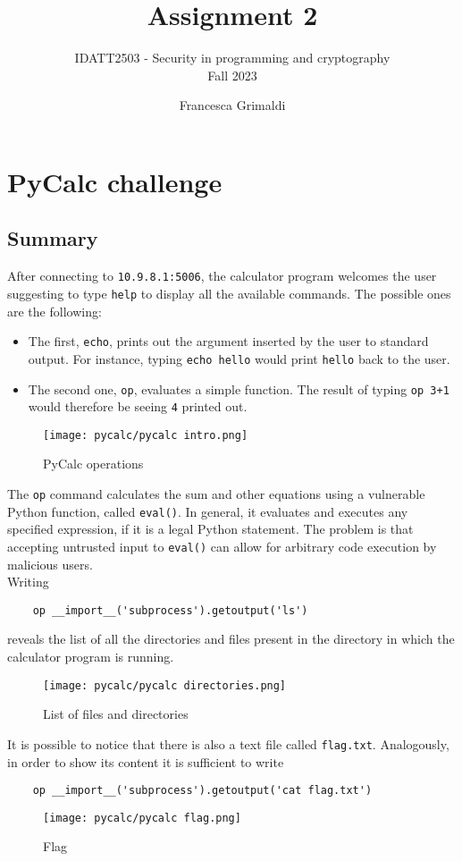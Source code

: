 \documentclass{article}
\title{%
    \huge Assignment 2
    }
\subtitle{%
    IDATT2503 - Security in programming and cryptography\\
    Fall 2023
    }
\author{%
  Francesca Grimaldi
}
\date{}
\begin{document}
\maketitle




\section{PyCalc challenge}

\subsection{Summary}
After connecting to \texttt{10.9.8.1:5006}, the calculator program welcomes the user suggesting to type \texttt{help} to display all the available commands. The possible ones are the following:
\begin{itemize}
    \item{The first, \texttt{echo}, prints out the argument inserted by the user to standard output. For instance, typing \texttt{echo hello} would print \texttt{hello} back to the user.}
    \item{The second one, \texttt{op}, evaluates a simple function. The result of typing \texttt{op 3+1} would therefore be seeing \texttt{4} printed out.}
\end{itemize}
\begin{figure}[H]
    \centering
    \texttt{[image: pycalc/pycalc intro.png]}
    \caption{PyCalc operations}
    \label{fig:PyCalc intro}
\end{figure}
The \texttt{op} command calculates the sum and other equations using a vulnerable Python function, called \texttt{eval()}. In general, it evaluates and executes any specified expression, if it is a legal Python statement. The problem is that accepting untrusted input to \texttt{eval()} can allow for arbitrary code execution by malicious users.\\
Writing
\begin{verbatim}
    op __import__('subprocess').getoutput('ls')
\end{verbatim}
reveals the list of all the directories and files present in the directory in which the calculator program is running.
\begin{figure}[H]
    \centering
    \texttt{[image: pycalc/pycalc directories.png]}
    \caption{List of files and directories}
    \label{fig:PyCalc directories}
\end{figure}
It is possible to notice that there is also a text file called \texttt{flag.txt}. Analogously, in order to show its content it is sufficient to write
\begin{verbatim}
    op __import__('subprocess').getoutput('cat flag.txt')
\end{verbatim}
\begin{figure}[H]
    \centering
    \texttt{[image: pycalc/pycalc flag.png]}
    \caption{Flag}
    \label{fig:PyCalc flag}
\end{figure}
\end{document}
